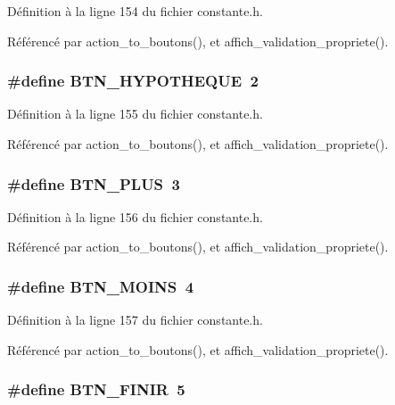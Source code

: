 D\'{e}finition \`{a} la ligne 154 du fichier constante.h.

R\'{e}f\'{e}renc\'{e} par action\_\-to\_\-boutons(), et affich\_\-validation\_\-propriete().
\subsubsection{\setlength{\rightskip}{0pt plus 5cm}\#define BTN\_\-HYPOTHEQUE~2}\label{constante_8h_8abb415e5329b3416280b4010d6eea94}




D\'{e}finition \`{a} la ligne 155 du fichier constante.h.

R\'{e}f\'{e}renc\'{e} par action\_\-to\_\-boutons(), et affich\_\-validation\_\-propriete().
\subsubsection{\setlength{\rightskip}{0pt plus 5cm}\#define BTN\_\-PLUS~3}\label{constante_8h_60818c4df194af25daf26bff4d0a2e90}




D\'{e}finition \`{a} la ligne 156 du fichier constante.h.

R\'{e}f\'{e}renc\'{e} par action\_\-to\_\-boutons(), et affich\_\-validation\_\-propriete().
\subsubsection{\setlength{\rightskip}{0pt plus 5cm}\#define BTN\_\-MOINS~4}\label{constante_8h_39c151107431a614326f800cd30ef9f4}




D\'{e}finition \`{a} la ligne 157 du fichier constante.h.

R\'{e}f\'{e}renc\'{e} par action\_\-to\_\-boutons(), et affich\_\-validation\_\-propriete().
\subsubsection{\setlength{\rightskip}{0pt plus 5cm}\#define BTN\_\-FINIR~5}\label{constante_8h_67ebcb6b36741458227713b613d12ee5}




